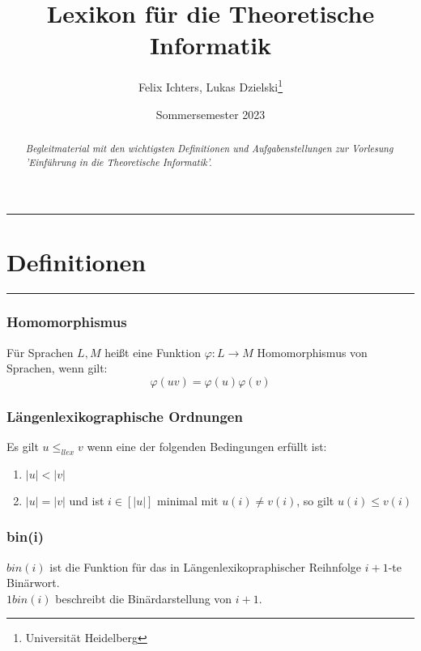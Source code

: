 \documentclass[DIV=15]{scrartcl}
\title{Lexikon für die Theoretische Informatik}
\author{Felix Ichters, Lukas Dzielski\thanks{Universität Heidelberg}}
\date{Sommersemester 2023}
\begin{document}
\maketitle
\rule{467.1pt}{0.4pt}

\begin{abstract}
\begin{flushright}
    \textit{Begleitmaterial mit den wichtigsten Definitionen und Aufgabenstellungen zur Vorlesung 'Einführung in die Theoretische Informatik'.}
\end{flushright}    
\end{abstract}

\newpage
\tableofcontents
\newpage
\part{Definitionen}
\rule{467.1pt}{0.4pt}
\section{Homomorphismus}
    Für Sprachen \(L,M\) heißt eine Funktion \(\varphi:L\to M\) 
    Homomorphismus von Sprachen, wenn gilt: \[\varphi(uv) = \varphi(u)\varphi(v)\]
\section{Längenlexikographische Ordnungen}
    Es gilt \(u \leq_{llex} v\) wenn eine der folgenden Bedingungen erfüllt ist:
    \begin{enumerate}
        \item \(|u|<|v|\)
        \item \(|u|=|v|\) und ist \(i\in[|u|]\) minimal mit \(u(i)\ne v(i)\), so gilt \(u(i)\leq v(i)\)
    \end{enumerate}
\section{bin(i)}
    \(bin(i)\) ist die Funktion für das in Längenlexikopraphischer Reihnfolge \(i+1\)-te Binärwort.\\
    \(1bin(i)\) beschreibt die Binärdarstellung von \(i+1\).
\end{document}
